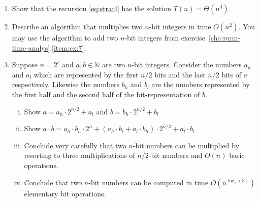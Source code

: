 \begin{enumerate}
\item Show that the recursion \eqref{eq:stra:4} has the solution $T(n) = Θ (n^3)$.  \label{item:str:4}
\item Describe an algorithm that multiplies two $n$-bit integers in time $O(n^2)$. You may use the algorithm to add two $n$-bit integers from exercise~\ref{cha:runn-time-analys}.\ref{item:ex:7}.  
\item Suppose $n = 2^\ell $  and $a,b ∈ ℕ$ are two $n$-bit integers. Consider the numbers $a_h$ and $a_l$ which are represented by the first $n/2$ bits and the last $n/2$ bits of $a$ respectively. Likewise the numbers $b_h$ and $b_l$ are the numbers represented by the first half and the second half of the bit-representation of $b$. 
  \begin{enumerate}[i)]
  \item Show $a = a_h ⋅ 2^{n/2} + a_l$ and  $b = b_h ⋅ 2^{n/2} + b_l$
  \item Show $a⋅b = a_h ⋅ b_h ⋅ 2^n + (a_h ⋅ b_l + a_l ⋅ b_h) ⋅2^{n/2} + a_l ⋅b_l$ 
  \item Conclude very carefully that two $n$-bit
    numbers can be multiplied by resorting to three multiplications of
    $n/2$-bit numbers and $O(n)$ basic  operations.
  \item Conclude that two $n$-bit
    numbers can be computed in time $O(n^{\log_2(3)})$
    elementary bit operations.
  \end{enumerate}




\end{enumerate}

